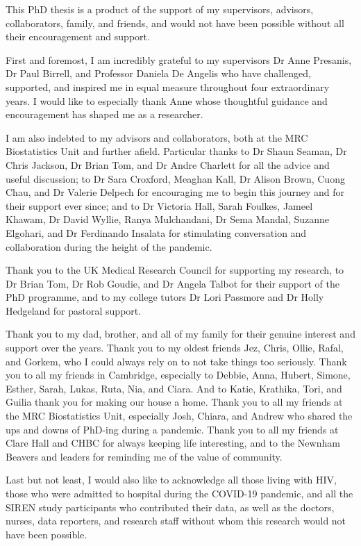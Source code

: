 
\begin{acknowledgements}

    This PhD thesis is a product of the support of my supervisors, advisors, collaborators, family, and friends, and would not have been possible without all their encouragement and support.

    First and foremost, I am incredibly grateful to my supervisors Dr Anne Presanis, Dr Paul Birrell, and Professor Daniela De Angelis who have challenged, supported, and inspired me in equal measure throughout four extraordinary years. I would like to especially thank Anne whose thoughtful guidance and encouragement has shaped me as a researcher.

    I am also indebted to my advisors and collaborators, both at the MRC Biostatistics Unit and further afield. Particular thanks to Dr Shaun Seaman, Dr Chris Jackson, Dr Brian Tom, and Dr Andre Charlett for all the advice and useful discussion; to Dr Sara Croxford, Meaghan Kall, Dr Alison Brown, Cuong Chau, and Dr Valerie Delpech for encouraging me to begin this journey and for their support ever since; and to Dr Victoria Hall, Sarah Foulkes, Jameel Khawam, Dr David Wyllie, Ranya Mulchandani, Dr Sema Mandal, Suzanne Elgohari, and Dr Ferdinando Insalata for stimulating conversation and collaboration during the height of the pandemic.
    
    Thank you to the UK Medical Research Council for supporting my research, to Dr Brian Tom, Dr Rob Goudie, and Dr Angela Talbot for their support of the PhD programme, and to my college tutors Dr Lori Passmore and Dr Holly Hedgeland for pastoral support.

    Thank you to my dad, brother, and all of my family for their genuine interest and support over the years. Thank you to my oldest friends Jez, Chris, Ollie, Rafal, and Gorkem, who I could always rely on to not take things too seriously. Thank you to all my friends in Cambridge, especially to Debbie, Anna, Hubert, Simone, Esther, Sarah, Lukas, Ruta, Nia, and Ciara. And to Katie, Krathika, Tori, and Guilia thank you for making our house a home. Thank you to all my friends at the MRC Biostatistics Unit, especially Josh, Chiara, and Andrew who shared the ups and downs of PhD-ing during a pandemic. Thank you to all my friends at Clare Hall and CHBC for always keeping life interesting, and to the Newnham Beavers and leaders for reminding me of the value of community.

    Last but not least, I would also like to acknowledge all those living with HIV, those who were admitted to hospital during the COVID-19 pandemic, and all the SIREN study participants who contributed their data, as well as the doctors, nurses, data reporters, and research staff without whom this research would not have been possible.

\end{acknowledgements}
